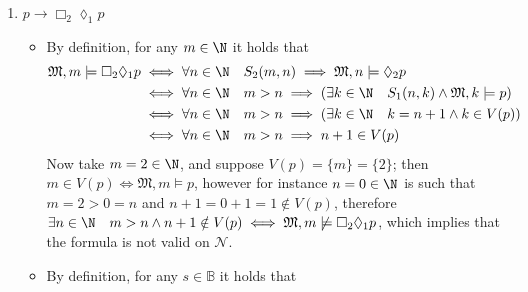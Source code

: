 \documentclass[a4paper, 12pt]{report}
\begin{document}
{\begin{enumerate}[label=(\alph*)]
\begin{itemize}
                        Now take $s = \varepsilon$, and suppose $V(p) = \{s\} = \{\varepsilon\}$; then $s \in V(p) \iff \mathfrak M, s \models p$, however if $t = s0 = 0$ or $t = s1 = 1$ there is no $u \in \mathbb B$ such that $u \sqsubset t$, therefore $(t = s0 \lor t = s1) \implies \nexists u \in \mathbb B \quad u \sqsubset t \land u \in V(p) \iff \mathfrak M', s \not\models \Box_1 \lozenge_2 p$, which implies that the formula is not valid on $\mathcal B$.
                \end{itemize}
            \item $p \rightarrow \Box_2 \lozenge_1 p$
                \begin{itemize}
                    \item By definition, for any $m \in \N$ it holds that
                        \begin{equation*}
                            \begin{split}
                                \mathfrak M , m \models \Box_2 \lozenge_1 p &\iff \forall n \in \N \quad S_2(m, n) \implies \mathfrak M, n \models \lozenge_2 p \\
                                                                            &\iff \forall n \in \N \quad m > n \implies (\exists k \in \N \quad S_1(n, k) \land \mathfrak M, k \models p) \\
                                                                            &\iff \forall n \in \N \quad m > n \implies (\exists k \in \N \quad k = n + 1 \land k \in V(p)) \\
                                                                            &\iff \forall n \in \N \quad m > n \implies n + 1 \in V(p)
                            \end{split}
                        \end{equation*}
                        Now take $m = 2 \in \N$, and suppose $V(p) = \{m\} = \{2\}$; then $m \in V(p) \iff \mathfrak M, m \models p$, however for instance $n = 0 \in \N$ is such that $m = 2 > 0 = n$ and $n + 1 = 0 + 1 = 1 \notin V(p)$, therefore $\exists n \in \N \quad m > n \land n + 1 \notin V(p) \iff \mathfrak M , m \not\models \Box_2 \lozenge_1 p$, which implies that the formula is not valid on $\mathcal N$.
                    \item By definition, for any $s \in \mathbb B$ it holds that
                        \begin{equation*}
                            \begin{split}

\end{split}
\end{equation*}
\end{itemize}
\end{enumerate}}
\end{document}
